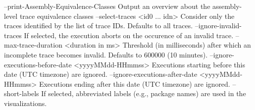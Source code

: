     --print-Assembly-Equivalence-Classes                Output an overview about
                                                        the assembly-level trace
                                                        equivalence classes
    --select-traces <id0 ... idn>                       Consider only the traces
                                                        identified by the list
                                                        of trace IDs. Defaults
                                                        to all traces.
    --ignore-invalid-traces                             If selected, the
                                                        execution aborts on the
                                                        occurence of an invalid
                                                        trace.
    --max-trace-duration <duration in ms>               Threshold (in
                                                        milliseconds) after
                                                        which an incomplete
                                                        trace becomes invalid.
                                                        Defaults to 600000 (10
                                                        minutes).
    --ignore-executions-before-date <yyyyMMdd-HHmmss>   Executions starting
                                                        before this date (UTC
                                                        timezone) are ignored.
    --ignore-executions-after-date <yyyyMMdd-HHmmss>    Executions ending after
                                                        this date (UTC timezone)
                                                        are ignored.
    --short-labels                                      If selected, abbreviated
                                                        labels (e.g., package
                                                        names) are used in the
                                                        visualizations.